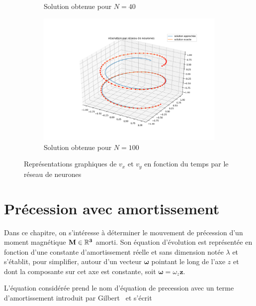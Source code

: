 \documentclass[12pt]{report}
\begin{document}
\begin{figure}
\begin{subfigure}[b]{0.4\textwidth}
        \caption{Solution obtenue pour $N=40$}
    \end{subfigure}
    \hfill
    \begin{subfigure}[b]{0.4\textwidth}
        \centering
        \includegraphics[width=1\textwidth, height=0.9\textwidth]{direct_training_N=100.png}
        \caption{Solution obtenue pour $N=100$}
    \end{subfigure}
       \caption{Représentations graphiques de $v_x$ et  $v_y$ en fonction du temps par le réseau de neurones}
       \label{fig:résultats 2 NN en fonction de N}
\end{figure}


\chapter{Précession avec amortissement}
\label{chap:precession_gilbert}

Dans ce chapitre, on s'intéresse à déterminer le mouvement de précession d'un moment magnétique $\bf{M} \in \mathbb{R}^3$ amorti.
Son équation d'évolution est représentée en fonction d'une constante d'amortissement réelle et sans dimension notée $\lambda$ et s'établit, pour simplifier, autour d'un vecteur ${\bm{\omega}}$ pointant le long de l'axe $z$ et dont la composante sur cet axe est constante, soit $\bm{\omega}=\omega_z{\bm z}$.

L'équation considérée prend le nom d'équation de precession avec un terme d'amortissement introduit par Gilbert~\cite{EquationGilbert} et s'écrit
\end{document}
